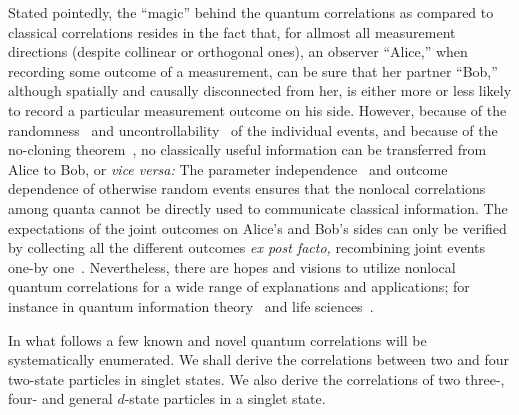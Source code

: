 \documentclass[pra,amsfonts,showpacs,showkeys,preprint]{revtex4}
\begin{document}
Stated pointedly, the ``magic'' behind the quantum correlations as compared to classical correlations resides in the fact that,
for allmost all measurement directions (despite collinear or orthogonal ones), an observer ``Alice,''
when recording some outcome of a measurement, can be sure that her partner ``Bob,''
although spatially and causally disconnected from her, is either more or less likely to record a particular measurement outcome on his side.
However, because of the randomness~\cite{svozil-qct} and uncontrollability~\cite{svozil-slash} of the individual events, and
because of the no-cloning theorem~\cite[pp.~39-40]{mermin-07},
no classically useful information can be transferred from Alice to Bob, or {\it vice versa:}
The parameter independence~\cite{clauser,shimony3} and outcome dependence of otherwise random events ensures that
the nonlocal correlations among quanta cannot be directly used to communicate classical information.
The expectations of the joint outcomes on Alice's and Bob's sides can only be  verified by collecting all the different outcomes {\it ex post facto,}
recombining joint events one-by one~\cite{Gill-Larss-04}.
Nevertheless, there are hopes and visions to utilize nonlocal quantum correlations for a wide range of explanations and
applications; for instance in quantum information theory~\cite{bruk-06} and life sciences~\cite{sum-05}.


In what follows a few known and novel quantum correlations will be systematically enumerated.
We shall derive the correlations between two and four two-state particles in singlet states.
We also derive the correlations of two three-, four- and general $d$-state particles in a singlet state.
\end{document}

